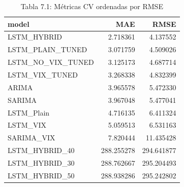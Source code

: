 \begin{table}
\caption{Tabla 7.1: Métricas CV ordenadas por RMSE}
\label{table_7_1}
\begin{tabular}{lrr}
\toprule
model & MAE & RMSE \\
\midrule
LSTM_HYBRID & 2.718361 & 4.137552 \\
LSTM_PLAIN_TUNED & 3.071759 & 4.509026 \\
LSTM_NO_VIX_TUNED & 3.125173 & 4.687714 \\
LSTM_VIX_TUNED & 3.268338 & 4.832399 \\
ARIMA & 3.965578 & 5.472330 \\
SARIMA & 3.967048 & 5.477041 \\
LSTM_Plain & 4.716135 & 6.411324 \\
LSTM_VIX & 5.059513 & 6.531163 \\
SARIMA_VIX & 7.820444 & 11.435428 \\
LSTM_HYBRID_40 & 288.255278 & 294.641877 \\
LSTM_HYBRID_30 & 288.762667 & 295.204493 \\
LSTM_HYBRID_50 & 288.938286 & 295.242802 \\
\bottomrule
\end{tabular}
\end{table}
